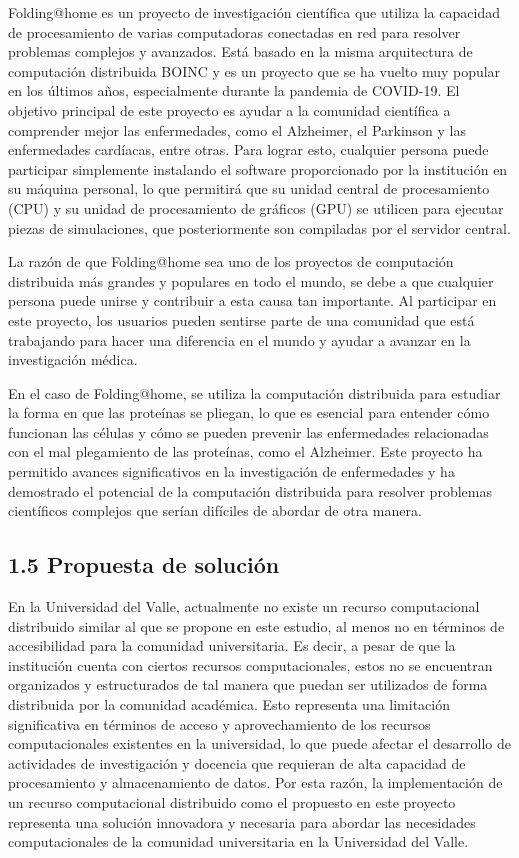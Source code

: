 \begin{spacing}{1.5}
  Folding@home es un proyecto de investigación científica que utiliza la
  capacidad de procesamiento de varias computadoras conectadas en red para
  resolver problemas complejos y avanzados. Está basado en la misma arquitectura
  de computación distribuida BOINC y es un proyecto que se ha vuelto muy popular
  en los últimos años, especialmente durante la pandemia de COVID-19. El objetivo
  principal de este proyecto es ayudar a la comunidad científica a comprender
  mejor las enfermedades, como el Alzheimer, el Parkinson y las enfermedades
  cardíacas, entre otras. Para lograr esto, cualquier persona puede participar
  simplemente instalando el software proporcionado por la institución en su
  máquina personal, lo que permitirá que su unidad central de procesamiento (CPU)
  y su unidad de procesamiento de gráficos (GPU) se utilicen para ejecutar piezas
  de simulaciones, que posteriormente son compiladas por el servidor central.

  La razón de que Folding@home sea uno de los proyectos de computación
  distribuida más grandes y populares en todo el mundo, se debe a que cualquier
  persona puede unirse y contribuir a esta causa tan importante. Al participar en
  este proyecto, los usuarios pueden sentirse parte de una comunidad que está
  trabajando para hacer una diferencia en el mundo y ayudar a avanzar en la
  investigación médica.

  En el caso de Folding@home, se utiliza la computación distribuida para
  estudiar la forma en que las proteínas se pliegan, lo que es esencial para
  entender cómo funcionan las células y cómo se pueden prevenir las enfermedades
  relacionadas con el mal plegamiento de las proteínas, como el Alzheimer. Este
  proyecto ha permitido avances significativos en la investigación de
  enfermedades y ha demostrado el potencial de la computación distribuida para
  resolver problemas científicos complejos que serían difíciles de abordar de
  otra manera. \cite{Folding@home-1}

  \subsection{1.5 Propuesta de solución}

  En la Universidad del Valle, actualmente no existe un recurso computacional
  distribuido similar al que se propone en este estudio, al menos no en términos
  de accesibilidad para la comunidad universitaria. Es decir, a pesar de que la
  institución cuenta con ciertos recursos computacionales, estos no se encuentran
  organizados y estructurados de tal manera que puedan ser utilizados de forma
  distribuida por la comunidad académica. Esto representa una limitación
  significativa en términos de acceso y aprovechamiento de los recursos
  computacionales existentes en la universidad, lo que puede afectar el
  desarrollo de actividades de investigación y docencia que requieran de alta
  capacidad de procesamiento y almacenamiento de datos. Por esta razón, la
  implementación de un recurso computacional distribuido como el propuesto en
  este proyecto representa una solución innovadora y necesaria para abordar las
  necesidades computacionales de la comunidad universitaria en la Universidad del
  Valle.


\end{spacing}

